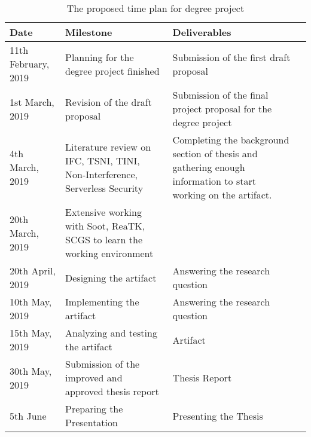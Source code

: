\begin{table}[htbp]
	\begin{tabularx}{\textwidth}{l X X l}
		\toprule
		\rowcolor[HTML]{34CDF9} 
		\textbf{Date} & \textbf{Milestone} & \textbf{Deliverables} \\ \midrule
		11th February, 2019 & Planning for the degree project finished & Submission of the first draft proposal \\ \midrule
		1st March, 2019 & Revision of the draft proposal & Submission of the final project proposal for the degree project \\ \midrule
		4th March, 2019 & Literature review on IFC, TSNI, TINI, Non-Interference, Serverless Security & Completing the background section of thesis and gathering enough information to start working on the artifact. \\ \midrule
		20th March, 2019 & Extensive working with Soot, ReaTK, SCGS to learn the working environment &  \\ \midrule
		20th April, 2019 & Designing the artifact & Answering the research question \\ \midrule
		10th May, 2019 & Implementing the artifact & Answering the research question \\ \midrule
		15th May, 2019 & Analyzing and testing the artifact & Artifact \\ \midrule
		30th May, 2019 & Submission of the improved and approved thesis report & Thesis Report \\ \midrule
		5th June & Preparing the Presentation & Presenting the Thesis \\ \bottomrule
	\end{tabularx}
	\caption{The proposed time plan for degree project}
	\label{table:timePlan}
\end{table}